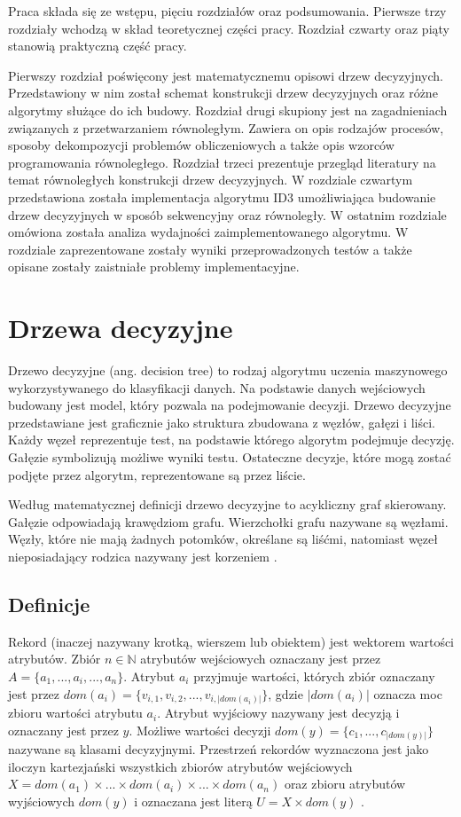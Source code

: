 \documentclass[12pt]{article}
\begin{document}
Praca składa się ze wstępu, pięciu rozdziałów oraz podsumowania. Pierwsze trzy
rozdziały wchodzą w skład teoretycznej części pracy. Rozdział czwarty oraz piąty
stanowią praktyczną część pracy.

Pierwszy rozdział poświęcony jest matematycznemu opisowi drzew decyzyjnych.
Przedstawiony w nim został schemat konstrukcji drzew decyzyjnych oraz różne algorytmy służące
do ich budowy. Rozdział drugi skupiony jest na zagadnieniach związanych z przetwarzaniem równoległym.
Zawiera on opis rodzajów procesów, sposoby dekompozycji problemów obliczeniowych a także
opis wzorców programowania równoległego. Rozdział trzeci prezentuje przegląd literatury 
na temat równoległych konstrukcji drzew decyzyjnych. W rozdziale czwartym przedstawiona
została implementacja algorytmu ID3 umożliwiająca budowanie drzew decyzyjnych w sposób
sekwencyjny oraz równoległy. W ostatnim rozdziale omówiona została analiza wydajności zaimplementowanego
algorytmu. W rozdziale zaprezentowane zostały wyniki przeprowadzonych
testów a także opisane zostały zaistniałe problemy implementacyjne. 
\newpage

\section{Drzewa decyzyjne}
Drzewo decyzyjne (ang. decision tree) to rodzaj algorytmu uczenia maszynowego
wykorzystywanego do klasyfikacji danych. Na podstawie danych wejściowych budowany jest model,
który pozwala na podejmowanie decyzji. Drzewo decyzyjne przedstawiane jest graficznie jako
struktura zbudowana z węzłów, gałęzi i liści. Każdy węzeł reprezentuje test, na podstawie
którego algorytm podejmuje decyzję. Gałęzie symbolizują możliwe wyniki testu. Ostateczne
decyzje, które mogą zostać podjęte przez algorytm, reprezentowane są przez liście.

Według matematycznej definicji drzewo decyzyjne to acykliczny graf skierowany.
Gałęzie odpowiadają krawędziom grafu. Wierzchołki grafu nazywane są węzłami. Węzły, które
nie mają żadnych potomków, określane są liśćmi, natomiast węzeł nieposiadający rodzica
nazywany jest korzeniem \cite{algorytmy-do-konstruowania-drzew-decyzyjnych}.

\subsection{Definicje}
Rekord (inaczej nazywany krotką, wierszem lub obiektem) jest wektorem wartości atrybutów.
Zbiór $n \in \mathbb{N}$ atrybutów wejściowych oznaczany jest przez $A = \{a_1, ..., a_i, ..., a_n\}$.
Atrybut $a_i$ przyjmuje wartości, których zbiór oznaczany jest przez
$dom(a_i) = \{v_{i,1}, v_{i,2}, ..., v_{i,|dom(a_i)|}\}$,
gdzie $|dom(a_i)|$ oznacza moc zbioru wartości atrybutu $a_i$. Atrybut wyjściowy nazywany
jest decyzją i oznaczany jest przez $y$. Możliwe wartości decyzji $dom(y) = \{c_1, ..., c_{|dom(y)|}\}$
nazywane są klasami decyzyjnymi. Przestrzeń rekordów wyznaczona jest jako iloczyn kartezjański
wszystkich zbiorów atrybutów wejściowych $X = dom(a_1) \times ... \times dom(a_i) \times ... \times dom(a_n)$
oraz zbioru atrybutów wyjściowych $dom(y)$ i oznaczana jest literą $U = X \times dom(y)$ \cite{data-mining-with-decision-trees}.
\end{document}
